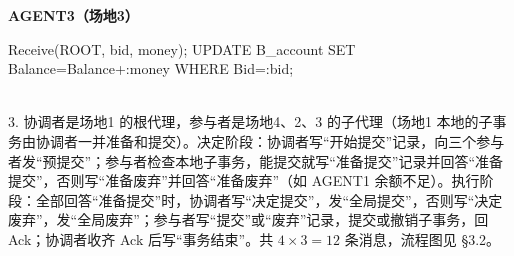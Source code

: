 \documentclass[10pt,a4paper]{article}
\newenvironment{keep}{\par\noindent\begin{minipage}{\linewidth}\setlength{\parskip}{3pt plus 1pt}}{\end{minipage}\par\vspace{2pt}}
\begin{document}
\begin{keep}
\begin{ans}[2018 年第三题]
\begin{minipage}[t]{0.43\linewidth}
\begin{code}
\end{code}
\textbf{AGENT3（场地3）}
\begin{code}
Receive(ROOT, bid, money);
UPDATE B_account
  SET Balance=Balance+:money
  WHERE Bid=:bid;
\end{code}
\end{minipage}\\[2pt]
3. 协调者是场地1 的根代理，参与者是场地4、2、3 的子代理（场地1 本地的子事务由协调者一并准备和提交）。决定阶段：协调者写“开始提交”记录，向三个参与者发“预提交”；参与者检查本地子事务，能提交就写“准备提交”记录并回答“准备提交”，否则写“准备废弃”并回答“准备废弃”（如 AGENT1 余额不足）。执行阶段：全部回答“准备提交”时，协调者写“决定提交”，发“全局提交”，否则写“决定废弃”，发“全局废弃”；参与者写“提交”或“废弃”记录，提交或撤销子事务，回 Ack；协调者收齐 Ack 后写“事务结束”。共 $4\times3=12$ 条消息，流程图见 \S3.2。
\end{ans}
\end{keep}
\end{document}
